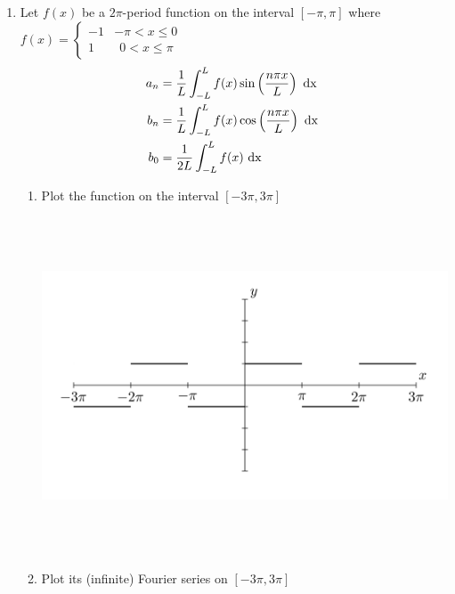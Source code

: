\documentclass{article}
\begin{document}
\begin{enumerate}
  \item Let $f(x)$ be a $2 \pi$-period function on the interval $[-\pi, \pi]$ where
  $\displaystyle
  f(x) =
  \begin{cases}
    -1 & - \pi < x \leq 0\\
    1 &\ \ 0 < x \leq \pi
  \end{cases}
  $
  \begin{align}
    a_n & = \frac{1}{L}  \int^L_{-L} f(x) \sin\left( \frac{n \pi x}{L} \right) \text{ dx }\\
    b_n & = \frac{1}{L}  \int^L_{-L} f(x) \cos\left( \frac{n \pi x}{L} \right) \text{ dx }\\
    b_0 & = \frac{1}{2L} \int^L_{-L} f(x) \text{ dx }
  \end{align}
  \begin{enumerate}
%
    \item Plot the function on the interval $[-3\pi, 3\pi]$

    \begin{center}
      \includegraphics[height=10cm]{HomeworkiiProblemia}
    \end{center}
    \item Plot its (infinite) Fourier series on $[-3 \pi, 3 \pi]$


\end{enumerate}
\end{enumerate}
\end{document}
